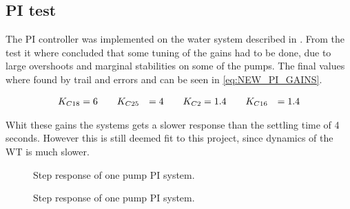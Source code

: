 \subsection*{PI test}

The PI controller was implemented on the water system described in . From the test it where concluded that some tuning of the gains had to be done, due to large overshoots and marginal stabilities on some of the pumps. The final values where found by trail and errors and can be seen in \eqref{eq:NEW_PI_GAINS}. 

\begin{equation}
\centering
	\begin{split}
	K_{C18} &= 6 \hspace{20pt} K_{C25} &= 4 \hspace{20pt} K_{C2} &= 1.4 \hspace{20pt} K_{C16} &= 1.4
	\end{split}
	\label{eq:NEW_PI_GAINS}
\end{equation}

Whit these gains the systems gets a slower response than the settling time of 4 seconds. However this is still deemed fit to this project, since dynamics of the WT is much slower.

\begin{figure}[H]
\centering

\caption{Step response of one pump PI system.}
\label{fig:Tikz_PI_PUMP_GAIN}
\end{figure}


\begin{figure}[H]
\centering

\caption{Step response of one pump PI system.}
\label{fig:Tikz_PI_PUMP_GAIN}
\end{figure}



